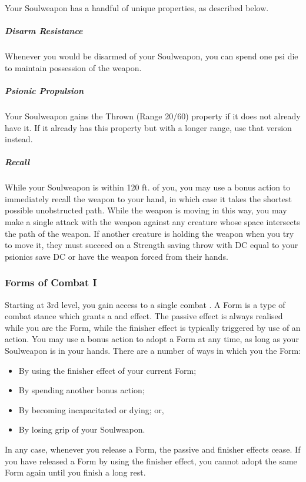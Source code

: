 Your Soulweapon has a handful of unique properties, as described below.

\subparagraph{Disarm Resistance}
Whenever you would be disarmed of your Soulweapon,
you can spend one psi die to maintain possession of the weapon.

\subparagraph{Psionic Propulsion}
Your Soulweapon gains the Thrown (Range 20/60) property if it does not already have it.
If it already has this property but with a longer range, use that version instead.

\subparagraph{Recall}
While your Soulweapon is within 120 ft. of you,
you may use a bonus action to immediately recall the weapon to your hand,
in which case it takes the shortest possible unobstructed path.
While the weapon is moving in this way,
you may make a single attack with the weapon against any creature
whose space intersects the path of the weapon.
If another creature is holding the weapon when you try to move it,
they must succeed on a Strength saving throw with DC equal to your psionics save DC
or have the weapon forced from their hands.

\subsubsection{Forms of Combat I}
Starting at 3rd level,
you gain access to a single combat .
A Form is a type of combat stance which grants a
 and  effect.
The passive effect is always realised
while you are  the Form,
while the finisher effect is typically triggered by use of an action.
You may use a bonus action to adopt a Form at any time,
as long as your Soulweapon is in your hands.
There are a number of ways in which you  the Form:
\begin{itemize}
    \item By using the finisher effect of your current Form;
    \item By spending another bonus action;
    \item By becoming incapacitated or dying; or,
    \item By losing grip of your Soulweapon.
\end{itemize}
In any case, whenever you release a Form, the passive and finisher effects cease.
If you have released a Form by using the finisher effect,
you cannot adopt the same Form again until you finish a long rest.

